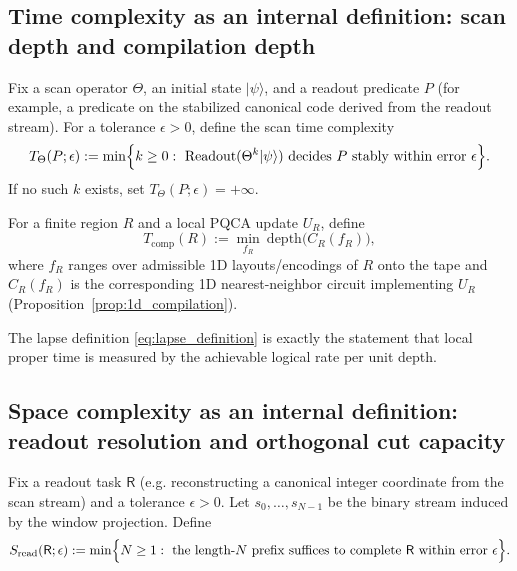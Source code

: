 \subsection{Time complexity as an internal definition: scan depth and compilation depth}
\label{subsec:time_internal_definition}

\begin{definition}
\label{def:scan_time_complexity}
Fix a scan operator $\Theta$, an initial state $|\psi\rangle$, and a readout predicate $P$ (for example, a predicate on the stabilized canonical code derived from the readout stream). For a tolerance $\epsilon>0$, define the scan time complexity
\begin{equation}
T_{\Theta}(P;\epsilon) := \min\Bigl\{k\ge 0:\ \mathrm{Readout}(\Theta^k|\psi\rangle)\ \text{decides $P$ stably within error $\epsilon$}\Bigr\}.
\end{equation}
If no such $k$ exists, set $T_{\Theta}(P;\epsilon)=+\infty$.
\end{definition}

\begin{definition}
\label{def:compilation_time_complexity}
For a finite region $R$ and a local PQCA update $U_R$, define
\begin{equation}
T_{\mathrm{comp}}(R) := \min_{f_R}\ \mathrm{depth}\bigl(C_R(f_R)\bigr),
\end{equation}
where $f_R$ ranges over admissible 1D layouts/encodings of $R$ onto the tape and $C_R(f_R)$ is the corresponding 1D nearest-neighbor circuit implementing $U_R$ (Proposition~\ref{prop:1d_compilation}).
\end{definition}

The lapse definition \eqref{eq:lapse_definition} is exactly the statement that local proper time is measured by the achievable logical rate per unit depth.

\subsection{Space complexity as an internal definition: readout resolution and orthogonal cut capacity}
\label{subsec:space_internal_definition}

\begin{definition}
\label{def:readout_space_complexity}
Fix a readout task $\mathsf{R}$ (e.g. reconstructing a canonical integer coordinate from the scan stream) and a tolerance $\epsilon>0$. Let $s_0,\dots,s_{N-1}$ be the binary stream induced by the window projection. Define
\begin{equation}
S_{\mathrm{read}}(\mathsf{R};\epsilon):=\min\Bigl\{N\ge 1:\ \text{the length-$N$ prefix suffices to complete $\mathsf{R}$ within error $\epsilon$}\Bigr\}.
\end{equation}
\end{definition}

